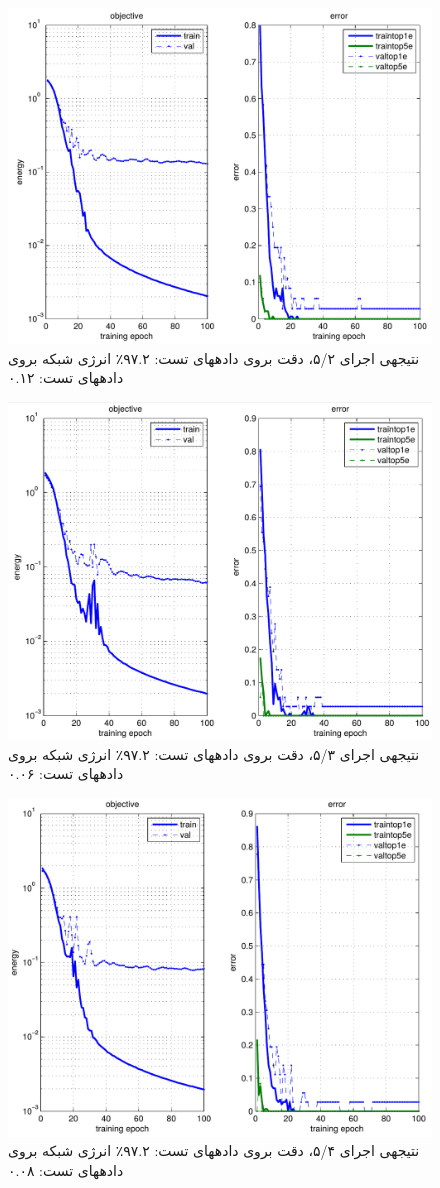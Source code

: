\documentclass[10pt,a4paper]{article}
\newcommand{\نیمفاصله}{\halfspace}
\renewcommand{\ }{\halfspace}
\newcommand{\مق}{\lr}
\begin{document}
\begin{figure}
\centering
\includegraphics[width=.8\textwidth]{../sec_C/results/2.png}
\caption{نتیجه\ ی اجرای ۵/۲، دقت بروی داده\ های تست: ۹۷.۲٪ انرژی شبکه بروی داده\ های تست: ۰.۱۲}\label{fig:epoch2}
\end{figure}
\begin{figure}
\centering
\includegraphics[width=.8\textwidth]{../sec_C/results/3.png}
\caption{نتیجه\ ی اجرای ۵/۳، دقت بروی داده\ های تست: ۹۷.۲٪ انرژی شبکه بروی داده\ های تست: ۰.۰۶}\label{fig:epoch3}
\end{figure}
\begin{figure}
\centering
\includegraphics[width=.8\textwidth]{../sec_C/results/4.png}
\caption{نتیجه\ ی اجرای ۵/۴، دقت بروی داده\ های تست: ۹۷.۲٪ انرژی شبکه بروی داده\ های تست: ۰.۰۸}\label{fig:epoch4}
\end{figure}
\end{document}
